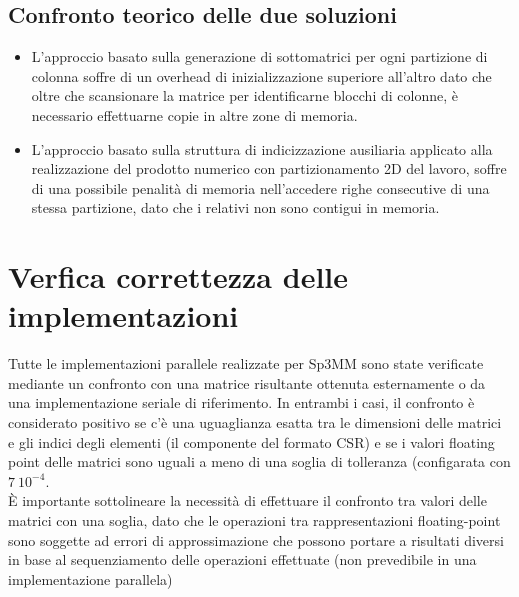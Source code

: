 \subsection{Confronto teorico delle due soluzioni}
\begin{itemize}
	\item
	L'approccio basato sulla generazione di sottomatrici per ogni partizione di colonna 
	soffre di un overhead di inizializzazione superiore all'altro dato che 
	oltre che scansionare la matrice per identificarne blocchi di colonne, è necessario effettuarne
	copie in altre zone di memoria.\\
	\item 
	L'approccio basato sulla struttura di indicizzazione ausiliaria applicato alla realizzazione
	del prodotto numerico con partizionamento 2D del lavoro, soffre di una possibile penalità di memoria
	nell'accedere righe consecutive di una stessa partizione, dato che i \nnz relativi non sono 
	contigui in memoria.
\end{itemize}

\section{Verfica correttezza delle implementazioni}
Tutte le implementazioni parallele realizzate per Sp3MM sono state verificate 
mediante un confronto con una matrice risultante ottenuta esternamente o
da una implementazione seriale di riferimento.
In entrambi i casi, il confronto è considerato positivo se c'è una uguaglianza esatta 
tra le dimensioni delle matrici e gli indici degli elementi \nnz (il componente  del formato CSR)
e se i valori floating point delle matrici sono uguali a meno di una soglia di tolleranza (configarata con $7~10^{-4}$.\\
È importante sottolineare la necessità di effettuare il confronto tra valori \nnz delle matrici con una soglia,
dato che le operazioni tra rappresentazioni floating-point sono soggette ad errori di approssimazione che possono portare 
a risultati diversi in base al sequenziamento delle operazioni effettuate (non prevedibile in una implementazione parallela)

